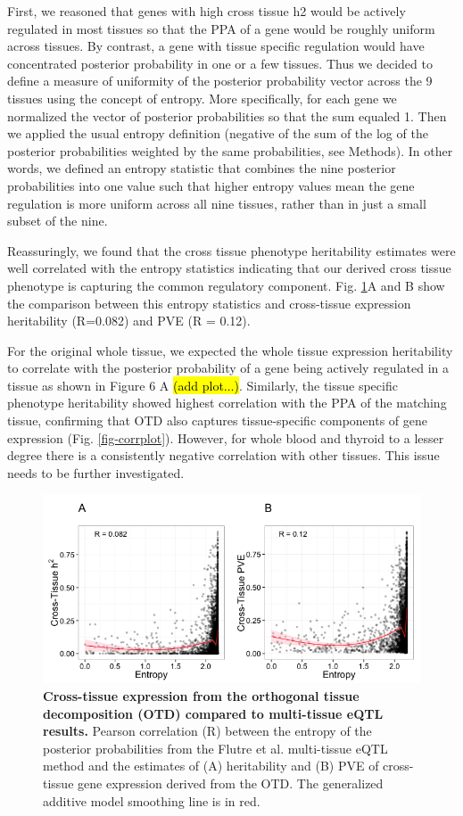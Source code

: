 \documentclass[10pt,letterpaper]{article}
\begin{document}
First, we reasoned that genes with high cross tissue h2 would be actively regulated in most tissues so that the PPA of a gene would be roughly uniform across tissues. By contrast, a gene with tissue specific regulation would have concentrated posterior probability in one or a few tissues. Thus we decided to define a measure of uniformity of the posterior probability vector across the 9 tissues using the concept of entropy. More specifically, for each gene we normalized the vector of posterior probabilities so that the sum equaled 1. Then we applied the usual entropy definition (negative of the sum of the log of the posterior probabilities weighted by the same probabilities, see Methods). In other words, we defined an entropy statistic that combines the nine posterior probabilities into one value such that higher entropy values mean the gene regulation is more uniform across all nine tissues, rather than in just a small subset of the nine.

Reassuringly, we found that the cross tissue phenotype heritability estimates were well correlated with the entropy statistics indicating that our derived cross tissue phenotype is capturing the common regulatory component. Fig. \ref{fig-ct-entropy}A and B show the comparison between this entropy statistics and cross-tissue expression heritability (R=0.082) and PVE (R = 0.12).

For the original whole tissue, we expected the whole tissue expression heritability to correlate with the posterior probability of a gene being actively regulated in a tissue as shown in Figure 6 A \hl{(add plot...)}. Similarly, the tissue specific phenotype heritability showed highest correlation with the PPA of the matching tissue, confirming that OTD also captures tissue-specific components of gene expression (Fig. \ref{fig-corrplot}). However, for whole blood and thyroid to a lesser degree there is a consistently negative correlation with other tissues. This issue needs to be further investigated.

\begin{figure}[h]
\includegraphics[width=12cm]{Figures/Fig-CT-entropy.png}
\caption{{\bf Cross-tissue expression from the 
orthogonal tissue decomposition (OTD) compared to multi-tissue eQTL results.} 
Pearson correlation (R) between the entropy of the posterior probabilities
from the Flutre et al. multi-tissue eQTL method 
and the estimates of (A) heritability and (B) PVE of cross-tissue
gene expression derived from the OTD. The generalized additive model smoothing 
line is in red.}
\label{fig-ct-entropy}
\end{figure}
\end{document}
